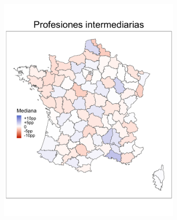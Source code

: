 \begin{figure}
\begin{subfigure}{0.235\textwidth}
	\includegraphics[width = \textwidth]{Figs/Efectos/Mapa_Efectos_CSP4_Modelo_H}
	\end{subfigure}
	~
	\begin{subfigure}{0.235\textwidth}

\end{subfigure}
\end{figure}
